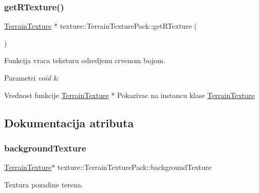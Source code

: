 \subsubsection{\texorpdfstring{get\+R\+Texture()}{getRTexture()}}
{\footnotesize\ttfamily \hyperlink{classtexture_1_1TerrainTexture}{Terrain\+Texture} $\ast$ texture\+::\+Terrain\+Texture\+Pack\+::get\+R\+Texture (\begin{DoxyParamCaption}{ }\end{DoxyParamCaption})}



Funkcija vraca teksturu odredjenu crvenom bojom. 


\begin{DoxyParams}{Parametri}
{\em void} & \\
\hline
\end{DoxyParams}
\begin{DoxyReturn}{Vrednost funkcije}
\hyperlink{classtexture_1_1TerrainTexture}{Terrain\+Texture} $\ast$ Pokazivac na instancu klase \hyperlink{classtexture_1_1TerrainTexture}{Terrain\+Texture} 
\end{DoxyReturn}


\subsection{Dokumentacija atributa}
\mbox{\label{classtexture_1_1TerrainTexturePack_a5fcc575543662461b66195cfa21875b1}} 
\subsubsection{\texorpdfstring{background\+Texture}{backgroundTexture}}
{\footnotesize\ttfamily \hyperlink{classtexture_1_1TerrainTexture}{Terrain\+Texture}$\ast$ texture\+::\+Terrain\+Texture\+Pack\+::background\+Texture\hspace{0.3cm}{\ttfamily [private]}}



Textura pozadine terena. 

\mbox{\label{classtexture_1_1TerrainTexturePack_a004a654fdda8c9f552f40986e2dd072f}} 
